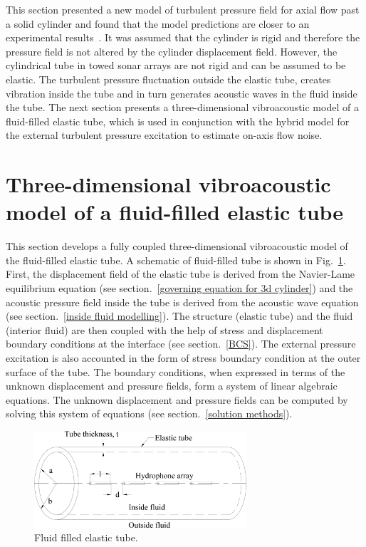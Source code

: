 \documentclass[twocolumn,10pt]{asme2ej}
\begin{document}
This section presented a new model of turbulent pressure field for axial flow past a solid cylinder and found that the model predictions are closer to an experimental results~\cite{Unni2011}. It was assumed that the cylinder is rigid and therefore the pressure field is not altered by the cylinder displacement field. However, the cylindrical tube in towed sonar arrays are not rigid and can be assumed to be elastic. The turbulent pressure fluctuation outside the elastic tube, creates vibration inside the tube and in turn generates acoustic waves in the fluid inside the tube. The next section presents a three-dimensional vibroacoustic model of a fluid-filled elastic tube, which is used in conjunction with the hybrid model for the external turbulent pressure excitation to estimate on-axis flow noise.


\section{Three-dimensional vibroacoustic model of a fluid-filled elastic tube} \label{sec:vamodel}
This section develops a fully coupled three-dimensional vibroacoustic model of the fluid-filled elastic tube. A schematic of fluid-filled tube is shown in Fig.~\ref{fig:fluid filled elastic tube}. First, the displacement field of the elastic tube is derived from the Navier-Lame equilibrium equation (see section.~\ref{governing equation for 3d cylinder}) and the acoustic pressure field inside the tube is derived from the acoustic wave equation (see section.~\ref{inside fluid modelling}). The structure (elastic tube) and the fluid (interior fluid) are then coupled with the help of stress and displacement boundary conditions at the interface (see section.~\ref{BCS}). The external pressure excitation is also accounted in the form of stress boundary condition at the outer surface of the tube. The boundary conditions, when expressed in terms of the unknown displacement and pressure fields, form a system of linear algebraic equations. The unknown displacement and pressure fields can be computed by solving this system of equations (see section.~\ref{solution methods}).

\begin{figure}
    \centering
    \includegraphics[width=3.1in]{figure/Sonar_array_element.eps}
    \caption{Fluid filled elastic tube.}
    \label{fig:fluid filled elastic tube}
\end{figure}
\end{document}
